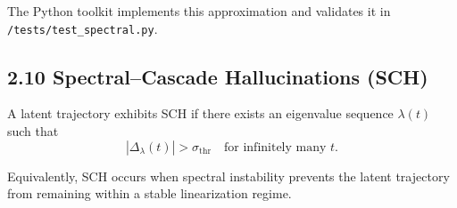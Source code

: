 The Python toolkit implements this approximation and validates it in
\texttt{/tests/test\_spectral.py}.

\subsection*{2.10 Spectral–Cascade Hallucinations (SCH)}

A latent trajectory exhibits SCH if there exists an eigenvalue sequence
$\lambda(t)$ such that
\[
|\Delta_\lambda(t)| > \sigma_{\mathrm{thr}}
\quad \text{for infinitely many } t.
\]

Equivalently, SCH occurs when spectral instability prevents the latent
trajectory from remaining within a stable linearization regime.

